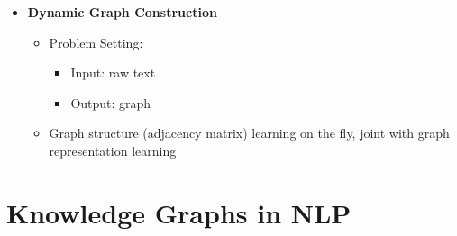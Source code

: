 \begin{itemize}
    \item \textbf{Dynamic Graph Construction}
    \begin{itemize}
    \item Problem Setting:
    \begin{itemize}
        \item Input: raw text
        \item Output: graph    
    \end{itemize}
    \item Graph structure (adjacency matrix) learning on the fly, joint with graph representation learning
    \end{itemize}
\end{itemize}

\section{Knowledge Graphs in NLP}

